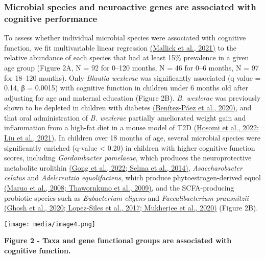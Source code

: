 \documentclass[
]{article}
\begin{document}
\hypertarget{microbial-species-and-neuroactive-genes-are-associated-with-cognitive-performance}{%
\subsubsection{Microbial species and neuroactive genes are associated
with cognitive
performance}\label{microbial-species-and-neuroactive-genes-are-associated-with-cognitive-performance}}

To assess whether individual microbial species were associated with
cognitive function, we fit multivariable linear regression
\href{https://www.zotero.org/google-docs/?4qS6UF}{(Mallick et al.,
2021)} to the relative abundance of each species that had at least 15\%
prevalence in a given age group (Figure 2A, N = 92 for 0--120 months, N
= 46 for 0--6 months, N = 97 for 18--120 months). Only \emph{Blautia
wexlerae} was significantly associated (q value = 0.14, β = 0.0015) with
cognitive function in children under 6 months old after adjusting for
age and maternal education (Figure 2B). \emph{B. wexlerae} was
previously shown to be depleted in children with diabetes
\href{https://www.zotero.org/google-docs/?6mU2nI}{(Benítez-Páez et al.,
2020)}, and that oral administration of \emph{B. wexlerae} partially
ameliorated weight gain and inflammation from a high-fat diet in a mouse
model of T2D \href{https://www.zotero.org/google-docs/?y83hpS}{(Hosomi
et al., 2022; Liu et al., 2021)}. In children over 18 months of age,
several microbial species were significantly enriched (q-value
\textless{} 0.20) in children with higher cognitive function scores,
including \emph{Gordonibacter pamelaeae}, which produces the
neuroprotective metabolite urolithin
\href{https://www.zotero.org/google-docs/?HGtTEY}{(Gong et al., 2022;
Selma et al., 2014)}, \emph{Asaccharobacter celatus} and
\emph{Adelcreutzia equolifaciens}, which produce phytoestrogen-derived
equol \href{https://www.zotero.org/google-docs/?HCKZqm}{(Maruo et al.,
2008; Thawornkuno et al., 2009)}, and the SCFA-producing probiotic
species such as \emph{Eubacterium eligens} and \emph{Faecalibacterium
prausnitzii} \href{https://www.zotero.org/google-docs/?3eyheK}{(Ghosh et
al., 2020; Lopez-Siles et al., 2017; Mukherjee et al., 2020)} (Figure
2B).

\texttt{[image: media/image4.png]}

\textbf{Figure 2 - Taxa and gene functional groups are associated with
cognitive function.}
\end{document}
